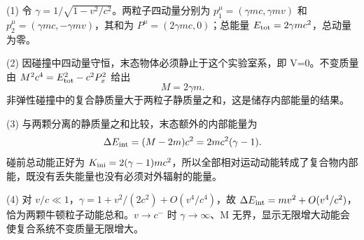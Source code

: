 (1) 令 \(\gamma=1/\sqrt{1-v^2/c^2}\)。两粒子四动量分别为 \(p_1^\mu=(\gamma mc,\gamma mv)\) 和 \(p_2^\mu=(\gamma mc,-\gamma mv)\)，其和为 \(P^\mu=(2\gamma mc,0)\)；总能量 \(E_{\rm tot}=2\gamma mc^2\)，总动量为零。

(2) 因碰撞中四动量守恒，末态物体必须静止于这个实验室系，即 V=0。不变质量由 \(M^2c^4=E_{\rm tot}^2-c^2P_x^2\) 给出
\[
M=2\gamma m.
\]
非弹性碰撞中的复合静质量大于两粒子静质量之和，这是储存内部能量的结果。

(3) 与两颗分离的静质量之和比较，末态额外的内部能量为
\[
\Delta E_{\rm int}=(M-2m)c^2=2mc^2(\gamma-1).
\]
碰前总动能正好为 \(K_{\rm ini}=2(\gamma-1)mc^2\)，所以全部相对运动动能转成了复合物内部能，既没有丢失能量也没有必须对外辐射的能量。

(4) 对 \(v/c\ll1\)，\(\gamma=1+v^2/(2c^2)+O(v^4/c^4)\)，故 \(\Delta E_{\rm int}=mv^2+O(v^4/c^2)\)，恰为两颗牛顿粒子动能总和。\(v\to c^{-}\) 时 \(\gamma\to\infty\)、M 无界，显示无限增大动能会使复合系统不变质量无限增大。
